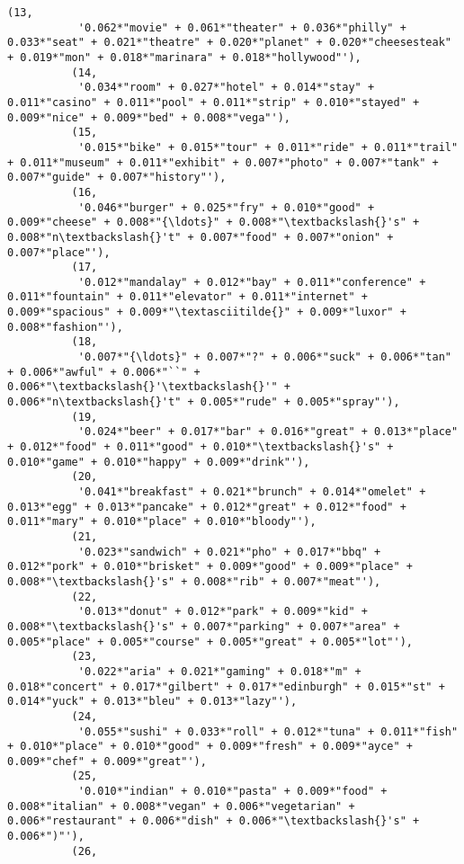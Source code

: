 \documentclass[11pt]{article}
\begin{document}
\begin{Verbatim}[commandchars=\\\{\}]
          (13,
           '0.062*"movie" + 0.061*"theater" + 0.036*"philly" + 0.033*"seat" + 0.021*"theatre" + 0.020*"planet" + 0.020*"cheesesteak" + 0.019*"mon" + 0.018*"marinara" + 0.018*"hollywood"'),
          (14,
           '0.034*"room" + 0.027*"hotel" + 0.014*"stay" + 0.011*"casino" + 0.011*"pool" + 0.011*"strip" + 0.010*"stayed" + 0.009*"nice" + 0.009*"bed" + 0.008*"vega"'),
          (15,
           '0.015*"bike" + 0.015*"tour" + 0.011*"ride" + 0.011*"trail" + 0.011*"museum" + 0.011*"exhibit" + 0.007*"photo" + 0.007*"tank" + 0.007*"guide" + 0.007*"history"'),
          (16,
           '0.046*"burger" + 0.025*"fry" + 0.010*"good" + 0.009*"cheese" + 0.008*"{\ldots}" + 0.008*"\textbackslash{}'s" + 0.008*"n\textbackslash{}'t" + 0.007*"food" + 0.007*"onion" + 0.007*"place"'),
          (17,
           '0.012*"mandalay" + 0.012*"bay" + 0.011*"conference" + 0.011*"fountain" + 0.011*"elevator" + 0.011*"internet" + 0.009*"spacious" + 0.009*"\textasciitilde{}" + 0.009*"luxor" + 0.008*"fashion"'),
          (18,
           '0.007*"{\ldots}" + 0.007*"?" + 0.006*"suck" + 0.006*"tan" + 0.006*"awful" + 0.006*"``" + 0.006*"\textbackslash{}'\textbackslash{}'" + 0.006*"n\textbackslash{}'t" + 0.005*"rude" + 0.005*"spray"'),
          (19,
           '0.024*"beer" + 0.017*"bar" + 0.016*"great" + 0.013*"place" + 0.012*"food" + 0.011*"good" + 0.010*"\textbackslash{}'s" + 0.010*"game" + 0.010*"happy" + 0.009*"drink"'),
          (20,
           '0.041*"breakfast" + 0.021*"brunch" + 0.014*"omelet" + 0.013*"egg" + 0.013*"pancake" + 0.012*"great" + 0.012*"food" + 0.011*"mary" + 0.010*"place" + 0.010*"bloody"'),
          (21,
           '0.023*"sandwich" + 0.021*"pho" + 0.017*"bbq" + 0.012*"pork" + 0.010*"brisket" + 0.009*"good" + 0.009*"place" + 0.008*"\textbackslash{}'s" + 0.008*"rib" + 0.007*"meat"'),
          (22,
           '0.013*"donut" + 0.012*"park" + 0.009*"kid" + 0.008*"\textbackslash{}'s" + 0.007*"parking" + 0.007*"area" + 0.005*"place" + 0.005*"course" + 0.005*"great" + 0.005*"lot"'),
          (23,
           '0.022*"aria" + 0.021*"gaming" + 0.018*"m" + 0.018*"concert" + 0.017*"gilbert" + 0.017*"edinburgh" + 0.015*"st" + 0.014*"yuck" + 0.013*"bleu" + 0.013*"lazy"'),
          (24,
           '0.055*"sushi" + 0.033*"roll" + 0.012*"tuna" + 0.011*"fish" + 0.010*"place" + 0.010*"good" + 0.009*"fresh" + 0.009*"ayce" + 0.009*"chef" + 0.009*"great"'),
          (25,
           '0.010*"indian" + 0.010*"pasta" + 0.009*"food" + 0.008*"italian" + 0.008*"vegan" + 0.006*"vegetarian" + 0.006*"restaurant" + 0.006*"dish" + 0.006*"\textbackslash{}'s" + 0.006*")"'),
          (26,

\end{Verbatim}
\end{document}
